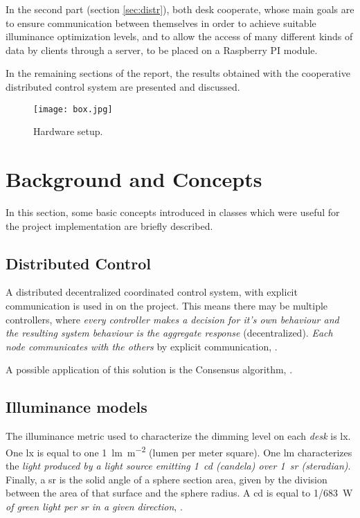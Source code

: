 \documentclass[english,fira]{ist-report}
\begin{document}
In the second part (section \ref{sec:distr}), both desk cooperate, whose main goals are to ensure communication between themselves in order to achieve suitable illuminance optimization levels, and to allow the access of many different kinds of data by clients through a server, to be placed on a Raspberry PI module. 

In the remaining sections of the report, the results obtained with the cooperative distributed control system are presented and discussed.

\begin{figure}[ht]
    \centering
    \texttt{[image: box.jpg]}
    \caption{Hardware setup.}
    \label{fig:setup}
\end{figure}

\pagebreak
\section{Background and Concepts} \label{background_concepts}

In this section, some basic concepts introduced in classes which were useful for the project implementation are briefly described.

\subsection{Distributed Control}

A distributed decentralized coordinated control system, with explicit communication is used in on the project. This means there may be multiple controllers, where \textit{every controller makes a decision for it's own behaviour and the resulting system behaviour is the aggregate response} (decentralized). \textit{Each node communicates with the others} by explicit communication, \cite{slides}. 

A possible application of this solution is the Consensus algorithm, \cite{consensusbernardino}.

\subsection{Illuminance models}\label{sec:light}

The illuminance metric used to characterize the dimming level on each \textit{desk} is \si{\lux}. One \si{\lux} is equal to one \SI{1}{\lumen\per\meter\squared} (lumen per meter square). One \si{\lumen} characterizes the \textit{light produced by a light source emitting \SI{1}{\candela} (candela) over \SI{1}{\steradian} (steradian)}. Finally, a \si{\steradian} is the solid angle of a sphere section area, given by the division between the area of that surface and the sphere radius. A \si{\candela} is equal to \SI[quotient-mode=fraction]{1/683}{W} \textit{of green light per \si{\steradian} in a given direction}, \cite{slides}.
\end{document}
